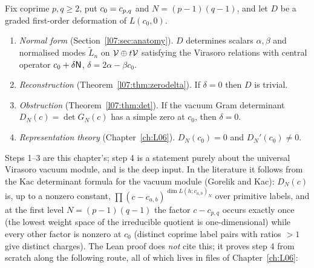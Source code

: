 Fix coprime $p,q\ge2$, put $c_0 = c_{p,q}$ and $N = (p-1)(q-1)$, and let $D$ be a graded first-order deformation
of $L(c_0,0)$.
\begin{enumerate}
\item \emph{Normal form} (Section~\ref{l07:sec:anatomy}). $D$ determines scalars $\alpha,\beta$ and normalised modes
  $\widetilde L_n$ on $\mathcal{V}\oplus t\mathcal{V}$ satisfying the Virasoro relations with central operator $c_0+\delta\mathsf{N}$,
  $\delta = 2\alpha-\beta c_0$.
\item \emph{Reconstruction} (Theorem~\ref{l07:thm:zerodelta}). If $\delta = 0$ then $D$ is trivial.
\item \emph{Obstruction} (Theorem~\ref{l07:thm:det}). If the vacuum Gram determinant $D_N(c) = \det G_N(c)$ has a
  simple zero at $c_0$, then $\delta = 0$.
\item \emph{Representation theory} (Chapter~\ref{ch:L06}). $D_N(c_0) = 0$ and $D_N'(c_0)\ne0$.
\end{enumerate}
Steps 1--3 are this chapter's; step 4 is a statement purely about the universal Virasoro vacuum module, and is
the deep input. In the literature it follows from the Kac determinant formula for the vacuum module (Gorelik and
Kac): $D_N(c)$ is, up to a nonzero constant, $\prod(c-c_{a,b})^{\dim L(h;c_{a,b})_N}$ over primitive labels, and
at the first level $N = (p-1)(q-1)$ the factor $c-c_{p,q}$ occurs exactly once (the lowest weight space of the
irreducible quotient is one-dimensional) while every other factor is nonzero at $c_0$ (distinct coprime label
pairs with ratios $>1$ give distinct charges). The Lean proof does \emph{not} cite this; it proves step 4 from
scratch along the following route, all of which lives in files of Chapter~\ref{ch:L06}:
